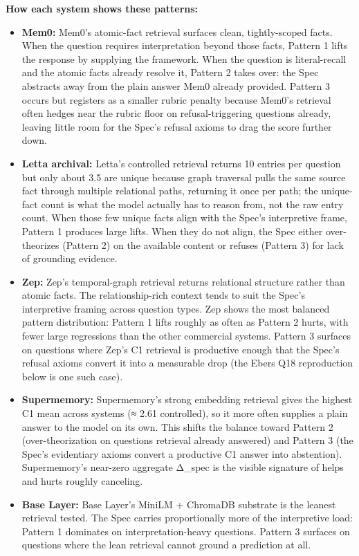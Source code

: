 \textbf{How each system shows these patterns:}

\begin{itemize}
\tightlist
\item
  \textbf{Mem0:} Mem0's atomic-fact retrieval surfaces clean,
  tightly-scoped facts. When the question requires interpretation beyond
  those facts, Pattern 1 lifts the response by supplying the framework.
  When the question is literal-recall and the atomic facts already
  resolve it, Pattern 2 takes over: the Spec abstracts away from the
  plain answer Mem0 already provided. Pattern 3 occurs but registers as
  a smaller rubric penalty because Mem0's retrieval often hedges near
  the rubric floor on refusal-triggering questions already, leaving
  little room for the Spec's refusal axioms to drag the score further
  down.
\item
  \textbf{Letta archival:} Letta's controlled retrieval returns 10
  entries per question but only about 3.5 are unique because graph
  traversal pulls the same source fact through multiple relational
  paths, returning it once per path; the unique-fact count is what the
  model actually has to reason from, not the raw entry count. When those
  few unique facts align with the Spec's interpretive frame, Pattern 1
  produces large lifts. When they do not align, the Spec either
  over-theorizes (Pattern 2) on the available content or refuses
  (Pattern 3) for lack of grounding evidence.
\item
  \textbf{Zep:} Zep's temporal-graph retrieval returns relational
  structure rather than atomic facts. The relationship-rich context
  tends to suit the Spec's interpretive framing across question types.
  Zep shows the most balanced pattern distribution: Pattern 1 lifts
  roughly as often as Pattern 2 hurts, with fewer large regressions than
  the other commercial systems. Pattern 3 surfaces on questions where
  Zep's C1 retrieval is productive enough that the Spec's refusal axioms
  convert it into a measurable drop (the Ebers Q18 reproduction below is
  one such case).
\item
  \textbf{Supermemory:} Supermemory's strong embedding retrieval gives
  the highest C1 mean across systems (≈ 2.61 controlled), so it more
  often supplies a plain answer to the model on its own. This shifts the
  balance toward Pattern 2 (over-theorization on questions retrieval
  already answered) and Pattern 3 (the Spec's evidentiary axioms convert
  a productive C1 answer into abstention). Supermemory's near-zero
  aggregate Δ\_spec is the visible signature of helps and hurts roughly
  canceling.
\item
  \textbf{Base Layer:} Base Layer's MiniLM + ChromaDB substrate is the
  leanest retrieval tested. The Spec carries proportionally more of the
  interpretive load: Pattern 1 dominates on interpretation-heavy
  questions. Pattern 3 surfaces on questions where the lean retrieval
  cannot ground a prediction at all.
\end{itemize}

